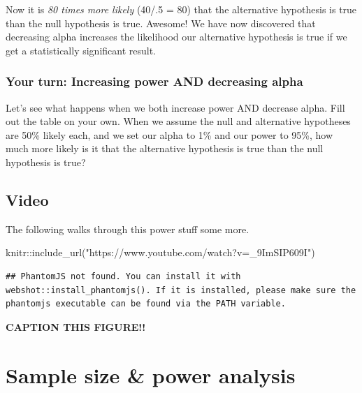 \documentclass[
]{book}
\newenvironment{Shaded}{\begin{snugshade}}{\end{snugshade}}
\newcommand{\FunctionTok}[1]{\textcolor[rgb]{0.00,0.00,0.00}{#1}}
\newcommand{\NormalTok}[1]{#1}
\newcommand{\SpecialCharTok}[1]{\textcolor[rgb]{0.00,0.00,0.00}{#1}}
\newcommand{\StringTok}[1]{\textcolor[rgb]{0.31,0.60,0.02}{#1}}
\begin{document}
Now it is \emph{80 times more likely} (40/.5 = 80) that the alternative hypothesis is true than the null hypothesis is true. Awesome! We have now discovered that decreasing alpha increases the likelihood our alternative hypothesis is true if we get a statistically significant result.

\hypertarget{your-turn-increasing-power-and-decreasing-alpha}{%
\subsubsection{Your turn: Increasing power AND decreasing alpha}\label{your-turn-increasing-power-and-decreasing-alpha}}

Let's see what happens when we both increase power AND decrease alpha. Fill out the table on your own. When we assume the null and alternative hypotheses are 50\% likely each, and we set our alpha to 1\% and our power to 95\%, how much more likely is it that the alternative hypothesis is true than the null hypothesis is true?

\hypertarget{video-1}{%
\subsection{Video}\label{video-1}}

The following walks through this power stuff some more.

\begin{Shaded}
\begin{Highlighting}[]
\NormalTok{knitr}\SpecialCharTok{::}\FunctionTok{include\_url}\NormalTok{(}\StringTok{"https://www.youtube.com/watch?v=\_9ImSIP609I"}\NormalTok{)}
\end{Highlighting}
\end{Shaded}

\begin{verbatim}
## PhantomJS not found. You can install it with webshot::install_phantomjs(). If it is installed, please make sure the phantomjs executable can be found via the PATH variable.
\end{verbatim}

\label{fig:unnamed-chunk-1}\textbf{CAPTION THIS FIGURE!!}

\hypertarget{sample-size-power-analysis}{%
\section{Sample size \& power analysis}\label{sample-size-power-analysis}}
\end{document}
